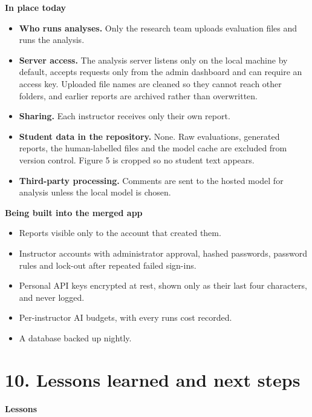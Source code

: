 \documentclass[
  11pt,
]{article}
\providecommand{\tightlist}{%
  \setlength{\itemsep}{0pt}\setlength{\parskip}{0pt}}
\begin{document}
\textbf{In place today}

\begin{itemize}
\tightlist
\item
  \textbf{Who runs analyses.} Only the research team uploads evaluation files
  and runs the analysis.
\item
  \textbf{Server access.} The analysis server listens only on the local machine
  by default, accepts requests only from the admin dashboard and can require an
  access key. Uploaded file names are cleaned so they cannot reach other
  folders, and earlier reports are archived rather than overwritten.
\item
  \textbf{Sharing.} Each instructor receives only their own report.
\item
  \textbf{Student data in the repository.} None. Raw evaluations, generated
  reports, the human-labelled files and the model cache are excluded from
  version control. Figure 5 is cropped so no student text appears.
\item
  \textbf{Third-party processing.} Comments are sent to the hosted model for
  analysis unless the local model is chosen.
\end{itemize}

\textbf{Being built into the merged app}

\begin{itemize}
\tightlist
\item
  Reports visible only to the account that created them.
\item
  Instructor accounts with administrator approval, hashed passwords, password
  rules and lock-out after repeated failed sign-ins.
\item
  Personal API keys encrypted at rest, shown only as their last four characters,
  and never logged.
\item
  Per-instructor AI budgets, with every run\textquotesingle s cost recorded.
\item
  A database backed up nightly.
\end{itemize}

\section{10. Lessons learned and next
steps}\label{10-lessons-learned-and-next-steps}

\textbf{Lessons}
\end{document}
